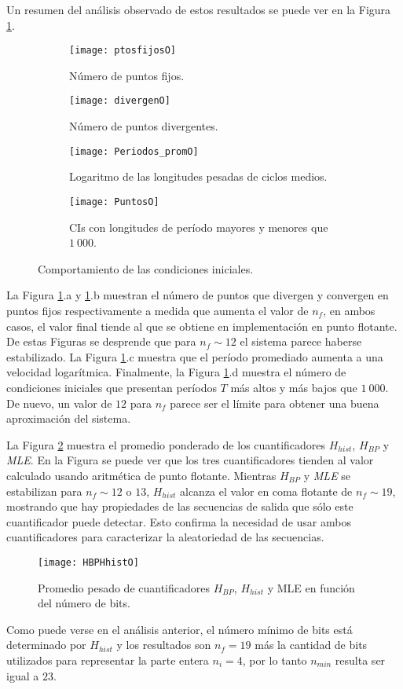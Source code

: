 Un resumen del análisis observado de estos resultados se puede ver en la Figura \ref{puntos}.
%
\begin{figure}
	\centering
	\begin{subfigure}[b]{0.49\textwidth}
		\texttt{[image: ptosfijosO]}
		\caption{Número de puntos fijos.}
	\end{subfigure}
	\hfill 
	\begin{subfigure}[b]{0.49\textwidth}
		\texttt{[image: divergenO]}
		\caption{Número de puntos divergentes.}
	\end{subfigure}
	\hfill 
	\begin{subfigure}[b]{0.49\textwidth}
		\texttt{[image: Periodos\_promO]}
		\caption{Logaritmo de las longitudes pesadas de ciclos medios.}
	\end{subfigure}
	\hfill   
	\begin{subfigure}[b]{0.49\textwidth}
		\texttt{[image: PuntosO]}
		\caption{CIs con longitudes de período mayores y menores que $1~000$.}
	\end{subfigure}
	\caption{Comportamiento de las condiciones iniciales.}\label{puntos}
\end{figure}
%
La Figura \ref{puntos}.a y \ref{puntos}.b muestran el número de puntos que divergen y convergen en puntos fijos respectivamente a medida que aumenta el valor de $n_f$, en ambos casos, el valor final tiende al que se obtiene en implementación en punto flotante.
De estas Figuras se desprende que para $n_f \sim 12$ el sistema parece haberse estabilizado.
La Figura \ref{puntos}.c muestra que el período promediado aumenta a una velocidad logarítmica.
Finalmente, la Figura \ref{puntos}.d muestra el número de condiciones iniciales que presentan períodos $T$ más altos y más bajos que $1~000$.
De nuevo, un valor de $12$ para $n_f$ parece ser el límite para obtener una buena aproximación del sistema.

La Figura \ref{fig:HBPHhist} muestra el promedio ponderado de los cuantificadores $H_{hist}$, $H_{BP}$ y \textsl{MLE}.
En la Figura se puede ver que los tres cuantificadores tienden al valor calculado usando aritmética de punto flotante.
Mientras $H_{BP}$ y \textsl{MLE} se estabilizan para $n_f \sim 12$ o $13$, $H_{hist}$ alcanza el valor en coma flotante de $n_f \sim 19$, mostrando que hay propiedades de las secuencias de salida que sólo este cuantificador puede detectar.
Esto confirma la necesidad de usar ambos cuantificadores para caracterizar la aleatoriedad de las secuencias.
%
\begin{figure}
	\centering
	\texttt{[image: HBPHhistO]}\\
	\caption{Promedio pesado de cuantificadores $H_{BP}$,  $H_{hist}$ y MLE en función del número de bits.}\label{fig:HBPHhist}
\end{figure}

Como puede verse en el análisis anterior, el número mínimo de bits está determinado por $H_{hist}$ y los resultados son $n_f = 19$ más la cantidad de bits utilizados para representar la parte entera $n_i = 4$, por lo tanto $n_{min}$ resulta ser igual a $23$.

